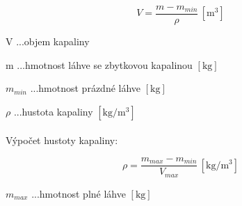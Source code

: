 \begin{equation}
    V = \frac{m - m_{min}}{\rho} \, \left[\mathrm{m^3}\right] \label{objem_kapalina}
\end{equation}

V ...objem kapaliny

m ...hmotnost láhve se zbytkovou kapalinou \([\mathrm{kg}]\)

\(m_{min}\) ...hmotnost prázdné láhve \([\mathrm{kg}]\)

\(\rho\) ...hustota kapaliny \([\mathrm{kg/m^3}]\)
\\
\\
Výpočet hustoty kapaliny:

\begin{equation}
    \rho = \frac{m_{max} - m_{min}}{V_{max}} \, \left[\mathrm{kg/m^3}\right] \label{objem_kapalina}
\end{equation}


\(m_{max}\) ...hmotnost plné láhve \([\mathrm{kg}]\)

